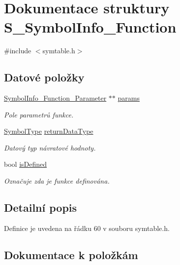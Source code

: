 \hypertarget{struct_s___symbol_info___function}{}\section{Dokumentace struktury S\+\_\+\+Symbol\+Info\+\_\+\+Function}
\label{struct_s___symbol_info___function}


{\ttfamily \#include $<$symtable.\+h$>$}

\subsection*{Datové položky}
\begin{DoxyCompactItemize}
\item 
\hyperlink{symtable_8h_a6f66814120a40ef33089435deec15f47}{Symbol\+Info\+\_\+\+Function\+\_\+\+Parameter} $\ast$$\ast$ \hyperlink{struct_s___symbol_info___function_a523efb68a2dc227e238af5fc1e1e38e0}{params}
\begin{DoxyCompactList}\small\item\em Pole parametrů funkce. \end{DoxyCompactList}\item 
\hyperlink{symtable_8h_a623952f6aa67a355a3840e25272b1c91}{Symbol\+Type} \hyperlink{struct_s___symbol_info___function_a4ce26a8194ccedd60da46576f0fb9453}{return\+Data\+Type}
\begin{DoxyCompactList}\small\item\em Datový typ návratové hodnoty. \end{DoxyCompactList}\item 
bool \hyperlink{struct_s___symbol_info___function_a8d55fb364b94ff0817d5b981f08ad26b}{is\+Defined}
\begin{DoxyCompactList}\small\item\em Označuje zda je funkce definována. \end{DoxyCompactList}\end{DoxyCompactItemize}


\subsection{Detailní popis}


Definice je uvedena na řádku 60 v souboru symtable.\+h.



\subsection{Dokumentace k položkám}
\mbox{\label{struct_s___symbol_info___function_a8d55fb364b94ff0817d5b981f08ad26b}} 
